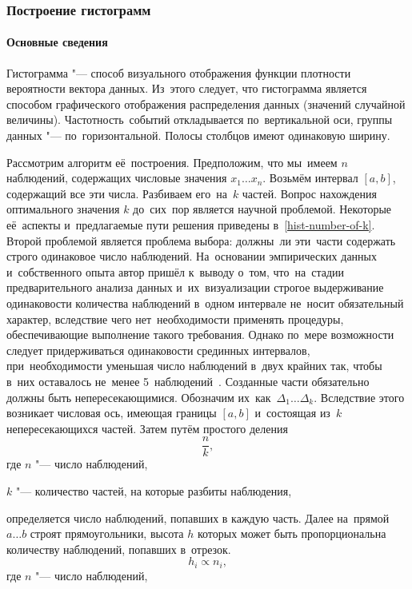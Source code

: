 \documentclass[]{scrartcl}
\begin{document}
\subsubsection{Построение гистограмм}
\paragraph{Основные сведения}
\par
Гистограмма "--- способ визуального отображения функции плотности вероятности вектора данных. Из~этого следует, что гистограмма является способом графического отображения распределения данных (значений случайной величины). Частотность~событий откладывается по~вертикальной оси, группы данных "--- по~горизонтальной. Полосы столбцов имеют одинаковую ширину.
\par 
Рассмотрим алгоритм её~построения. Предположим, что мы~имеем $n$ наблюдений, содержащих числовые значения $x_{1}\ldots x_{n}$. Возьмём интервал $[a, b]$, содержащий все эти числа. Разбиваем его~на~$k$ частей. Вопрос нахождения оптимального значения $k$ до~сих~пор является научной проблемой. Некоторые её~аспекты и~предлагаемые пути решения приведены в~\ref{hist-number-of-k}. Второй проблемой является проблема выбора: должны~ли эти~части содержать строго одинаковое число наблюдений. На~основании эмпирических данных и~собственного опыта автор пришёл к~выводу о~том, что~на~стадии предварительного анализа данных и~их~визуализации строгое выдерживание одинаковости количества наблюдений в~одном интервале не~носит обязательный характер, вследствие чего нет~необходимости применять процедуры, обеспечивающие выполнение такого требования. Однако по~мере возможности следует придерживаться одинаковости срединных интервалов, при~необходимости уменьшая число наблюдений в~двух крайних так, чтобы в~них оставалось не~менее 5~наблюдений~\cite{Nowiczkij:oczenka-pogresh}. Созданные части обязательно должны быть непересекающимися. Обозначим их~как~$\Delta_{1}\ldots \Delta_{k}$. Вследствие этого возникает числовая ось, имеющая границы $[a, b]$ и~состоящая из~$k$ непересекающихся частей. Затем путём простого деления
\begin{equation}\label{hist-simple}
\frac{n}{k},
\end{equation}
где $n$ "--- число наблюдений,

$k$ "--- количество частей, на которые разбиты наблюдения,
\par
определяется число наблюдений, попавших в каждую часть. Далее на~прямой $a\ldots b$ строят прямоугольники, высота $h$ которых может быть пропорциональна количеству наблюдений, попавших в~отрезок.
\begin{equation}\label{eq:hist-simple-prop}
h_{i} \propto n_{i},
\end{equation}
где $n$ "--- число наблюдений,
\end{document}

